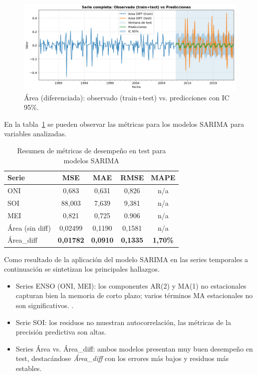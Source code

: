 \begin{figure}[H]\centering
\includegraphics[scale=.42]{Figures/pred_area_d.png}
\caption{Área (diferenciada): observado (train+test) vs. predicciones con IC 95\%.}
\label{fig:pred_area_d}
\end{figure}

En la tabla~\ref{tab:metricas_sarima} se pueden observar las métricas para los modelos SARIMA para variables analizadas. 

\begin{table}[H]
\centering
\caption{Resumen de métricas de desempeño en test para modelos SARIMA}
\label{tab:metricas_sarima}
\begin{tabular}{lcccc}
\toprule
\textbf{Serie} & \textbf{MSE} & \textbf{MAE} & \textbf{RMSE} & \textbf{MAPE} \\
\midrule
ONI  & 0,683  & 0,631  & 0,826  & n/a \\
SOI  & 88,003 & 7,639  & 9,381  & n/a \\
MEI  & 0,821  & 0,725  & 0.906  & n/a \\
Área (sin diff) & 0,02499 & 0,1190 & 0,1581 & n/a \\
Área\_diff      & \textbf{0,01782} & \textbf{0,0910} & \textbf{0,1335} & \textbf{1,70\%} \\
\bottomrule
\end{tabular}
\end{table}

Como resultado de la aplicación del modelo SARIMA en las series temporales a continuación se sintetizan los principales hallazgos.

\begin{itemize}
    \item Series ENSO (ONI, MEI): los componentes AR(2) y MA(1) no estacionales
    capturan bien la memoria de corto plazo; varios términos MA estacionales no son
    significativos. .
    \item Serie SOI: los residuos no muestran autocorrelación, las métricas de la precisión predictiva son altas.
    \item Series Área vs. Área\_diff: ambos modelos presentan muy buen desempeño en test,
    destacándose \emph{Área\_diff} con los errores más bajos y residuos más
    estables.
\end{itemize}

